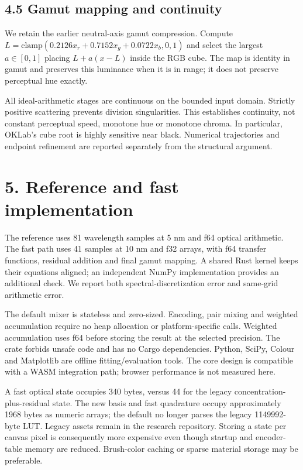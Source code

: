 \documentclass[
  10pt,
  twocolumn]{article}
\begin{document}
\hypertarget{gamut-mapping-and-continuity}{%
\subsection{4.5 Gamut mapping and
continuity}\label{gamut-mapping-and-continuity}}

We retain the earlier neutral-axis gamut compression. Compute
\(L=\mathrm{clamp}(0.2126x_r+0.7152x_g+0.0722x_b,0,1)\) and select the
largest \(a\in[0,1]\) placing \(L+a(x-L)\) inside the RGB cube. The map
is identity in gamut and preserves this luminance when it is in range;
it does not preserve perceptual hue exactly.

All ideal-arithmetic stages are continuous on the bounded input domain.
Strictly positive scattering prevents division singularities. This
establishes continuity, not constant perceptual speed, monotone hue or
monotone chroma. In particular, OKLab's cube root is highly sensitive
near black. Numerical trajectories and endpoint refinement are reported
separately from the structural argument.

\hypertarget{reference-and-fast-implementation}{%
\section{5. Reference and fast
implementation}\label{reference-and-fast-implementation}}

The reference uses 81 wavelength samples at 5 nm and f64 optical
arithmetic. The fast path uses 41 samples at 10 nm and f32 arrays, with
f64 transfer functions, residual addition and final gamut mapping. A
shared Rust kernel keeps their equations aligned; an independent NumPy
implementation provides an additional check. We report both
spectral-discretization error and same-grid arithmetic error.

The default mixer is stateless and zero-sized. Encoding, pair mixing and
weighted accumulation require no heap allocation or platform-specific
calls. Weighted accumulation uses f64 before storing the result at the
selected precision. The crate forbids unsafe code and has no Cargo
dependencies. Python, SciPy, Colour and Matplotlib are offline
fitting/evaluation tools. The core design is compatible with a WASM
integration path; browser performance is not measured here.

A fast optical state occupies 340 bytes, versus 44 for the legacy
concentration-plus-residual state. The new basis and fast quadrature
occupy approximately 1968 bytes as numeric arrays; the default no longer
parses the legacy 1149992-byte LUT. Legacy assets remain in the research
repository. Storing a state per canvas pixel is consequently more
expensive even though startup and encoder-table memory are reduced.
Brush-color caching or sparse material storage may be preferable.
\end{document}

